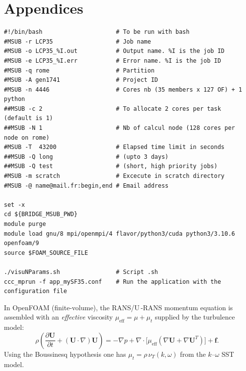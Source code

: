 \section*{Appendices}




\renewcommand{\thetable}{A\arabic{table}}
\renewcommand{\thefigure}{A\arabic{figure}}
\setcounter{table}{0}  %
\setcounter{figure}{0} %




\begin{verbatim}
#!/bin/bash                     # To be run with bash
#MSUB -r LCP35                  # Job name
#MSUB -o LCP35_%I.out           # Output name. %I is the job ID
#MSUB -e LCP35_%I.err           # Error name. %I is the job ID
#MSUB -q rome                   # Partition
#MSUB -A gen1741                # Project ID
#MSUB -n 4446                   # Cores nb (35 members x 127 OF) + 1 python
##MSUB -c 2                     # To allocate 2 cores per task (default is 1)
##MSUB -N 1                     # Nb of calcul node (128 cores per node on rome)
#MSUB -T  43200                 # Elapsed time limit in seconds
##MSUB -Q long                  # (upto 3 days)
##MSUB -Q test                  # (short, high priority jobs)
#MSUB -m scratch                # Excecute in scratch directory
#MSUB -@ name@mail.fr:begin,end # Email address

set -x
cd ${BRIDGE_MSUB_PWD}
module purge
module load gnu/8 mpi/openmpi/4 flavor/python3/cuda python3/3.10.6 openfoam/9
source $FOAM_SOURCE_FILE

./visuNParams.sh                # Script .sh
ccc_mprun -f app_mySF35.conf    # Run the application with the configuration file
\end{verbatim}


\newpage


In OpenFOAM (finite-volume), the RANS/U\,-RANS momentum equation is assembled with an
\emph{effective} viscosity $\mu_{\mathrm{eff}}=\mu+\mu_t$ supplied by the turbulence model:
\begin{equation}
\rho\left(\frac{\partial \mathbf{U}}{\partial t} + (\mathbf{U}\!\cdot\!\nabla)\mathbf{U}\right)
= -\nabla p + \nabla\!\cdot\!\Big[\mu_{\mathrm{eff}}\left(\nabla \mathbf{U} + \nabla \mathbf{U}^{T}\right)\Big] + \mathbf{f}.
\end{equation}
Using the Boussinesq hypothesis one has $\mu_t=\rho\,\nu_T(k,\omega)$ from the $k$–$\omega$ SST model.

